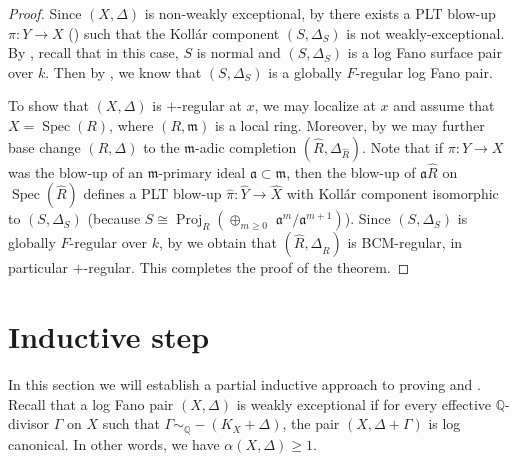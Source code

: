 \documentclass[11pt,reqno]{amsart}
\newcommand{\Q}{\mathbb{Q}}
\newcommand{\fa}{\mathfrak{a}}
\newcommand{\fm}{\mathfrak{m}}
\newcommand{\isom}{\cong}
\DeclareMathOperator{\Spec}{Spec}
\DeclareMathOperator{\Proj}{Proj}
\numberwithin{equation}{section}
\theoremstyle{definition}
\begin{document}
\begin{proof}
    Since $(X, \Delta)$ is non-weakly exceptional, by  there exists a PLT blow-up $\pi:Y \to X$ () such that the Koll\'ar component $(S, \Delta_S)$ is not weakly-exceptional. By , recall that in this case, $S$ is normal and $(S, \Delta_S)$ is a log Fano surface pair over $k$. Then by , we know that $(S, \Delta_S)$ is a globally $F$-regular log Fano pair.

    To show that $(X, \Delta)$ is $+$-regular at $x$, we may localize at $x$ and assume that $X = \Spec(R)$, where $(R, \fm)$ is a local ring. Moreover, by \cite[Corollary 6.9]{BMPSTWWMixedCharMMP} we may further base change $(R, \Delta)$ to the $\fm$-adic completion $(\widehat{R}, \Delta_{\widehat{R}})$. Note that if $\pi: Y \to X $ was the blow-up of an $\fm$-primary ideal $\fa \subset \fm$, then the blow-up of $\fa \widehat{R}$ on $\Spec(\widehat{R})$ defines a PLT blow-up $\widehat{\pi}: \widehat{Y} \to \widehat{X}$ with Koll\'ar component isomorphic to $(S, \Delta_S)$ (because $S \isom \Proj_R( \oplus_{m \geq 0} \, \, \fa^m/ \fa^{m+1})$).
    Since $(S, \Delta_S)$ is globally $F$-regular over $k$, by \cite[Theorem F]{MaSchwedeTuckerWaldronWitaszekAdjoint} we obtain that $(\widehat{R}, \Delta_{\widehat{R}})$ is BCM-regular, in particular $+$-regular.  This completes the proof of the theorem.
\end{proof}


\section{Inductive step} \label{section:inductivestep}

In this section we will establish a partial inductive approach to proving  and . Recall that a log Fano pair $(X, \Delta)$ is weakly exceptional if for every effective $\Q$-divisor $\Gamma$ on $X$ such that $\Gamma \sim _\Q -(K_X + \Delta)$, the pair $(X, \Delta+ \Gamma)$ is log canonical. In other words, we have $\alpha(X,\Delta) \geq 1$.
\end{document}
